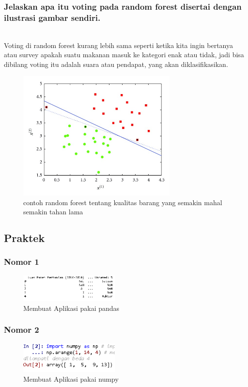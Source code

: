 \subsubsection{Jelaskan apa itu voting pada random forest disertai dengan ilustrasi gambar sendiri.}
\hfill\\
Voting di random forest kurang lebih sama seperti ketika kita ingin bertanya atau survey apakah suatu makanan masuk ke kategori enak atau tidak, jadi bisa dibilang voting itu adalah suara atau pendapat, yang akan diklasifikasikan.
\begin{figure}[H]
	\centering
	\includegraphics[width=8cm]{figures/1174089/3/klasifikasirandomforest.png}
	\caption{contoh random forest tentang kualitas barang yang semakin mahal semakin tahan lama}
\end{figure}

\subsection{Praktek}

\subsubsection{Nomor 1}
\hfill\break

\begin{figure}[H]
\centerline{\includegraphics[width=5cm]{figures/1174089/3/praktek0.PNG}}
\caption{Membuat Aplikasi pakai pandas}
\label{labelgambar}
\end{figure}

\subsubsection{Nomor 2}
\hfill\break

\begin{figure}[H]
\centerline{\includegraphics[width=5cm]{figures/1174089/3/praktek1.PNG}}
\caption{Membuat Aplikasi pakai numpy}
\label{labelgambar}
\end{figure}

